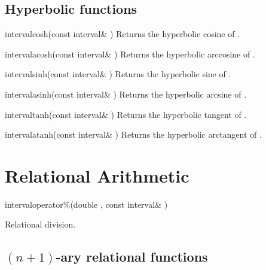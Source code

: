 \documentclass{manual}
\begin{document}
\subsection{Hyperbolic functions}

\begin{deffun}{interval}{cosh}{(const interval\& )}
  Returns the hyperbolic cosine of .
\end{deffun}

\begin{deffun}{interval}{acosh}{(const interval\& )}
  Returns the hyperbolic arccosine of .
\end{deffun}

\begin{deffun}{interval}{sinh}{(const interval\& )}
  Returns the hyperbolic sine of .
\end{deffun}

\begin{deffun}{interval}{asinh}{(const interval\& )}
  Returns the hyperbolic arcsine of .
\end{deffun}

\begin{deffun}{interval}{tanh}{(const interval\& )}
  Returns the hyperbolic tangent of .
\end{deffun}

\begin{deffun}{interval}{atanh}{(const interval\& )}
  Returns the hyperbolic arctangent of .
\end{deffun}

\section{Relational Arithmetic}\label{sec:relational-arithmetic}

\begin{deffun}{interval}{operator\%}{(double , const interval\& )}
  \begin{operation}
  \end{operation}
Relational division.
\end{deffun}

\subsection{$(n+1)$-ary relational functions}
\end{document}
